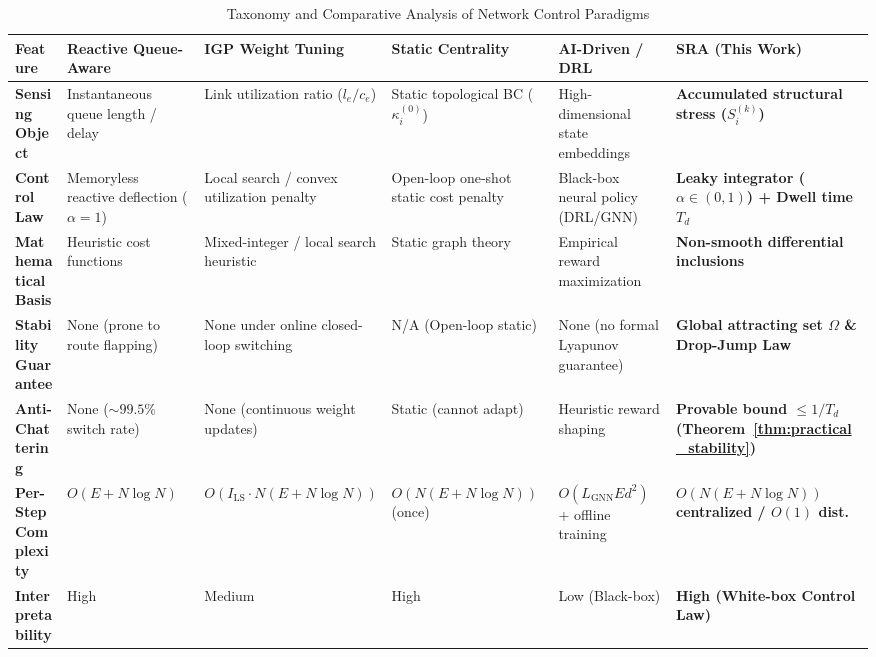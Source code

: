\documentclass[journal]{IEEEtran}
\theoremstyle{plain}
\theoremstyle{definition}
\newcommand{\rev}[1]{{\color{blue}#1}}
\begin{document}
\begin{table}[t!]
\centering
\caption{Taxonomy and Comparative Analysis of Network Control Paradigms}
\label{tab:related_work_comparison}
\renewcommand{\arraystretch}{1.25}
\footnotesize
\begin{tabularx}{\textwidth}{|l|X|X|X|X|X|}
\hline
\textbf{Feature} & \textbf{Reactive Queue-Aware \cite{Macabale2020Cradle,SM2025Novel}} & \textbf{\rev{IGP Weight Tuning \cite{Fortz2000OSPF}}} & \textbf{Static Centrality \cite{Upadhyay2024OpticalBC,DeMedeiros2017QuasiShortest}} & \textbf{AI-Driven / DRL \cite{Wei2023GRLPS, Feng2025MultiAgentGNN}} & \textbf{SRA (This Work)} \\
\hline \hline
\textbf{Sensing Object} & Instantaneous queue length / delay & Link utilization ratio ($l_e / c_e$) & Static topological BC ($\kappa_i^{(0)}$) & High-dimensional state embeddings & \textbf{Accumulated structural stress ($S_i^{(k)}$)} \\
\hline
\textbf{Control Law} & Memoryless reactive deflection ($\alpha=1$) & Local search / convex utilization penalty & Open-loop one-shot static cost penalty & Black-box neural policy (DRL/GNN) & \textbf{Leaky integrator ($\alpha \in (0,1)$) + Dwell time $T_d$} \\
\hline
\textbf{Mathematical Basis} & Heuristic cost functions & Mixed-integer / local search heuristic & Static graph theory & Empirical reward maximization & \textbf{Non-smooth differential inclusions \cite{Aubin1984Differential}} \\
\hline
\textbf{Stability Guarantee} & None (prone to route flapping) & None under online closed-loop switching & N/A (Open-loop static) & None (no formal Lyapunov guarantee) & \textbf{Global attracting set $\Omega$ \& Drop-Jump Law} \\
\hline
\textbf{\rev{Anti-Chattering}} & \rev{None ($\sim 99.5\%$ switch rate)} & \rev{None (continuous weight updates)} & \rev{Static (cannot adapt)} & \rev{Heuristic reward shaping} & \textbf{\rev{Provable bound $\le 1/T_d$ (Theorem~\ref{thm:practical_stability})}} \\
\hline
\textbf{\rev{Per-Step Complexity}} & \rev{$O(E + N\log N)$} & \rev{$O(I_{\text{LS}}\cdot N(E+N\log N))$} & \rev{$O(N(E+N\log N))$ (once)} & \rev{$O(L_{\text{GNN}} E d^2)$ + offline training} & \textbf{\rev{$O(N(E+N\log N))$ centralized / $O(1)$ dist.}} \\
\hline
\textbf{Interpretability} & High & Medium & High & Low (Black-box) & \textbf{High (White-box Control Law)} \\
\hline
\end{tabularx}
\end{table}
\end{document}
